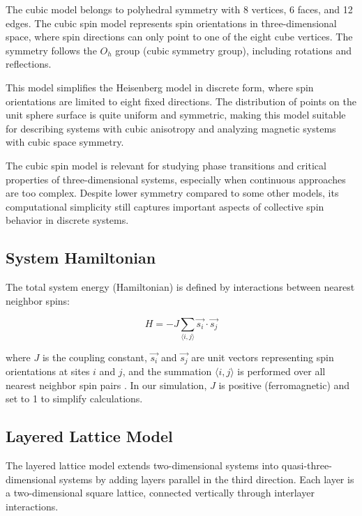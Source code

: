 \documentclass[conference, compsoc, twoside]{IEEEtran}
\begin{document}
The cubic model belongs to polyhedral symmetry with 8 vertices, 6 faces, and 12 edges. The cubic spin model represents spin orientations in three-dimensional space, where spin directions can only point to one of the eight cube vertices. The symmetry follows the $O_h$ group (cubic symmetry group), including rotations and reflections.

This model simplifies the Heisenberg model in discrete form, where spin orientations are limited to eight fixed directions. The distribution of points on the unit sphere surface is quite uniform and symmetric, making this model suitable for describing systems with cubic anisotropy and analyzing magnetic systems with cubic space symmetry.

The cubic spin model is relevant for studying phase transitions and critical properties of three-dimensional systems, especially when continuous approaches are too complex. Despite lower symmetry compared to some other models, its computational simplicity still captures important aspects of collective spin behavior in discrete systems.

\subsection{System Hamiltonian}

The total system energy (Hamiltonian) is defined by interactions between nearest neighbor spins:

\begin{equation}
H = -J \sum_{\langle i,j \rangle} \vec{s_i} \cdot \vec{s_j}
\label{eq:hamiltonian}
\end{equation}

where $J$ is the coupling constant, $\vec{s_i}$ and $\vec{s_j}$ are unit vectors representing spin orientations at sites $i$ and $j$, and the summation $\langle i,j \rangle$ is performed over all nearest neighbor spin pairs \cite{Yunita2022}. In our simulation, $J$ is positive (ferromagnetic) and set to 1 to simplify calculations.

\subsection{Layered Lattice Model}

The layered lattice model extends two-dimensional systems into quasi-three-dimensional systems by adding layers parallel in the third direction. Each layer is a two-dimensional square lattice, connected vertically through interlayer interactions.
\end{document}
